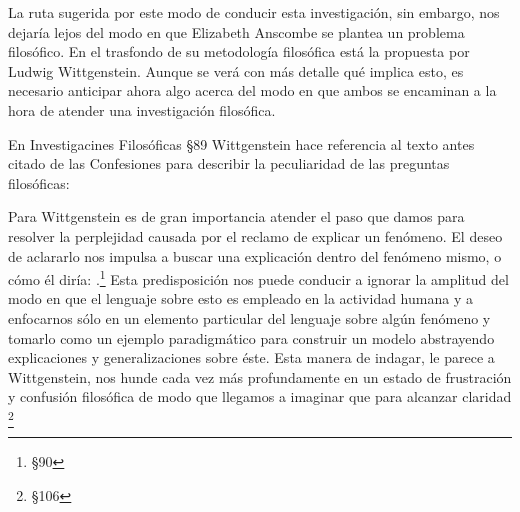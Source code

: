   La ruta sugerida por este modo de conducir esta investigación, sin embargo, nos
  dejaría lejos del modo en que Elizabeth Anscombe se plantea un problema
  filosófico. En el trasfondo de su metodología filosófica está la propuesta por
  Ludwig Wittgenstein. Aunque se verá con más detalle qué implica esto, es
  necesario anticipar ahora algo acerca del modo en que ambos se encaminan a la
  hora de atender una investigación filosófica.

  En Investigacines Filosóficas \S89 Wittgenstein hace referencia al texto antes
  citado de las Confesiones para describir la peculiaridad de las preguntas
  filosóficas:

  Para Wittgenstein es de gran importancia atender el paso que damos para resolver
  la perplejidad causada por el reclamo de explicar un fenómeno. El deseo de
  aclararlo nos impulsa a buscar una explicación dentro del fenómeno mismo, o cómo
  él diría: .\footnote{\S90} Esta predisposición nos puede conducir a ignorar la
  amplitud del modo en que el lenguaje sobre esto es empleado en la actividad
  humana y a enfocarnos sólo en un elemento particular del lenguaje sobre algún
  fenómeno y tomarlo como un ejemplo paradigmático para construir un modelo
  abstrayendo explicaciones y generalizaciones sobre éste. Esta manera de indagar,
  le parece a Wittgenstein, nos hunde cada vez más profundamente en un estado de
  frustración y confusión filosófica de modo que llegamos a imaginar que para
  alcanzar claridad \footnote{\S106}

